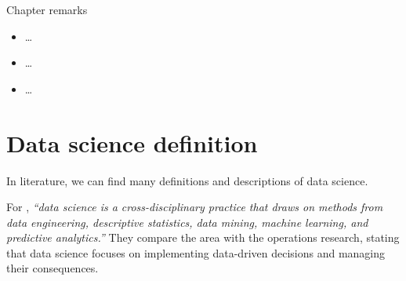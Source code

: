 \begin{mainbox}{Chapter remarks}


  \startcontents[chapters]
  \vspace{1em}


  \begin{itemize}
    \item \dots
  \end{itemize}


  \begin{itemize}
    \item \dots
  \end{itemize}


  \begin{itemize}
    \item \dots
  \end{itemize}
\end{mainbox}

{}
\clearpage

\section{Data science definition}

In literature, we can find many definitions and descriptions of data science.

For \textcite{Zumel2019}, \emph{``data science is a cross-disciplinary practice that draws
on methods from data engineering, descriptive statistics, data mining, machine learning,
and predictive analytics.''}  They compare the area with the operations research, stating
that data science focuses on implementing data-driven decisions and managing their
consequences.


